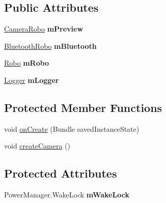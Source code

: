 \subsection*{Public Attributes}
\begin{DoxyCompactItemize}
\item 
\hypertarget{classcom_1_1aronbordin_1_1robo_1_1camera_1_1MainActivity_a3f9dd2014690d37d73f4e2ec9e0f8f3b}{\hyperlink{classcom_1_1aronbordin_1_1robo_1_1camera_1_1CameraRobo}{Camera\+Robo} {\bfseries m\+Preview}}\label{classcom_1_1aronbordin_1_1robo_1_1camera_1_1MainActivity_a3f9dd2014690d37d73f4e2ec9e0f8f3b}

\item 
\hypertarget{classcom_1_1aronbordin_1_1robo_1_1camera_1_1MainActivity_ab78efbf63f4c132ae0f542615fd7851a}{\hyperlink{classcom_1_1aronbordin_1_1robo_1_1camera_1_1BluetoothRobo}{Bluetooth\+Robo} {\bfseries m\+Bluetooth}}\label{classcom_1_1aronbordin_1_1robo_1_1camera_1_1MainActivity_ab78efbf63f4c132ae0f542615fd7851a}

\item 
\hypertarget{classcom_1_1aronbordin_1_1robo_1_1camera_1_1MainActivity_af03009a4416e8cc5d44a87fa3ae61ca5}{\hyperlink{classcom_1_1aronbordin_1_1robo_1_1camera_1_1Robo}{Robo} {\bfseries m\+Robo}}\label{classcom_1_1aronbordin_1_1robo_1_1camera_1_1MainActivity_af03009a4416e8cc5d44a87fa3ae61ca5}

\item 
\hypertarget{classcom_1_1aronbordin_1_1robo_1_1camera_1_1MainActivity_af596156b326eb6f7d052bcab89f1685d}{\hyperlink{classcom_1_1aronbordin_1_1robo_1_1camera_1_1Logger}{Logger} {\bfseries m\+Logger}}\label{classcom_1_1aronbordin_1_1robo_1_1camera_1_1MainActivity_af596156b326eb6f7d052bcab89f1685d}

\end{DoxyCompactItemize}
\subsection*{Protected Member Functions}
\begin{DoxyCompactItemize}
\item 
void \hyperlink{classcom_1_1aronbordin_1_1robo_1_1camera_1_1MainActivity_a6541ba1e15bcab9d74545566ca5d1ec2}{on\+Create} (Bundle saved\+Instance\+State)
\item 
void \hyperlink{classcom_1_1aronbordin_1_1robo_1_1camera_1_1MainActivity_abe3e630bb05b302a826dad2eccf76bd7}{create\+Camera} ()
\end{DoxyCompactItemize}
\subsection*{Protected Attributes}
\begin{DoxyCompactItemize}
\item 
\hypertarget{classcom_1_1aronbordin_1_1robo_1_1camera_1_1MainActivity_a9e44250adb4b7025eb8d083d7b4bcdf4}{Power\+Manager.\+Wake\+Lock {\bfseries m\+Wake\+Lock}}\label{classcom_1_1aronbordin_1_1robo_1_1camera_1_1MainActivity_a9e44250adb4b7025eb8d083d7b4bcdf4}

\end{DoxyCompactItemize}


